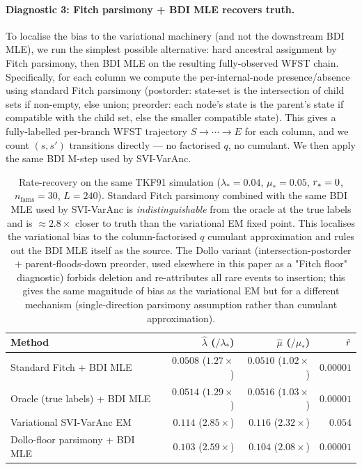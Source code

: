 \paragraph{Diagnostic 3: Fitch parsimony + BDI MLE recovers truth.}
To localise the bias to the variational machinery (and not the
downstream BDI MLE), we run the simplest possible alternative:
hard ancestral assignment by Fitch parsimony, then BDI MLE on the
resulting fully-observed WFST chain.  Specifically, for each
column we compute the per-internal-node presence/absence using
standard Fitch parsimony (postorder: state-set is the
intersection of child sets if non-empty, else union; preorder:
each node's state is the parent's state if compatible with the
child set, else the smaller compatible state).  This gives a
fully-labelled per-branch WFST trajectory $S \to \cdots \to E$
for each column, and we count $(s, s')$ transitions directly ---
no factorised $q$, no cumulant.  We then apply the same BDI M-step
used by SVI-VarAnc.

\begin{table}[ht]
\centering\small
\begin{tabular}{lrrr}
\toprule
Method & $\hat\lambda$ ($/\lambda_*$) & $\hat\mu$ ($/\mu_*$) & $\hat{r}$ \\
\midrule
Standard Fitch + BDI MLE       & $0.0508$ ($1.27\times$) & $0.0510$ ($1.02\times$) & $0.00001$ \\
Oracle (true labels) + BDI MLE & $0.0514$ ($1.29\times$) & $0.0516$ ($1.03\times$) & $0.00001$ \\
Variational SVI-VarAnc EM      & $0.114$  ($2.85\times$) & $0.116$  ($2.32\times$) & $0.054$   \\
Dollo-floor parsimony + BDI MLE & $0.103$  ($2.59\times$) & $0.104$  ($2.08\times$) & $0.00001$ \\
\bottomrule
\end{tabular}
\caption{Rate-recovery on the same TKF91 simulation
($\lambda_* = 0.04$, $\mu_* = 0.05$, $r_* = 0$,
$n_{\text{fams}} = 30$, $L = 240$).  Standard Fitch parsimony
combined with the same BDI MLE used by SVI-VarAnc is
\emph{indistinguishable} from the oracle at the true labels and
is $\approx 2.8\times$ closer to truth than the variational EM
fixed point.  This localises the variational bias to the
column-factorised $q$ cumulant approximation and rules out the
BDI MLE itself as the source.  The Dollo variant
(intersection-postorder $+$ parent-floods-down preorder, used
elsewhere in this paper as a "Fitch floor" diagnostic) forbids
deletion and re-attributes all rare events to insertion; this
gives the same magnitude of bias as the variational EM but for a
different mechanism (single-direction parsimony assumption rather
than cumulant approximation).}
\label{tab:fitch-plus-bdi}
\end{table}

